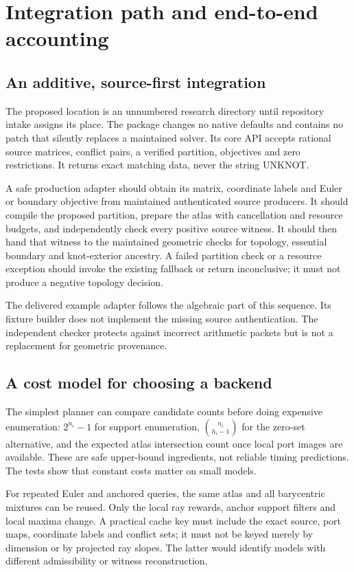 \section{Integration path and end-to-end accounting}
\label{sec:integration}

\subsection{An additive, source-first integration}
The proposed location is an unnumbered research directory until repository intake assigns its place. The package changes no native defaults and contains no patch that silently replaces a maintained solver. Its core API accepts rational source matrices, conflict pairs, a verified partition, objectives and zero restrictions. It returns exact matching data, never the string \textsf{UNKNOT}.

A safe production adapter should obtain its matrix, coordinate labels and Euler or boundary objective from maintained authenticated source producers. It should compile the proposed partition, prepare the atlas with cancellation and resource budgets, and independently check every positive source witness. It should then hand that witness to the maintained geometric checks for topology, essential boundary and knot-exterior ancestry. A failed partition check or a resource exception should invoke the existing fallback or return inconclusive; it must not produce a negative topology decision.

The delivered example adapter follows the algebraic part of this sequence. Its fixture builder does not implement the missing source authentication. The independent checker protects against incorrect arithmetic packets but is not a replacement for geometric provenance.

\subsection{A cost model for choosing a backend}
The simplest planner can compare candidate counts before doing expensive enumeration: $2^{n_i}-1$ for support enumeration, $\binom{n_i}{h_i-1}$ for the zero-set alternative, and the expected atlas intersection count once local port images are available. These are safe upper-bound ingredients, not reliable timing predictions. The tests show that constant costs matter on small models.

For repeated Euler and anchored queries, the same atlas and all barycentric mixtures can be reused. Only the local ray rewards, anchor support filters and local maxima change. A practical cache key must include the exact source, port maps, coordinate labels and conflict sets; it must not be keyed merely by dimension or by projected ray slopes. The latter would identify models with different admissibility or witness reconstruction.

